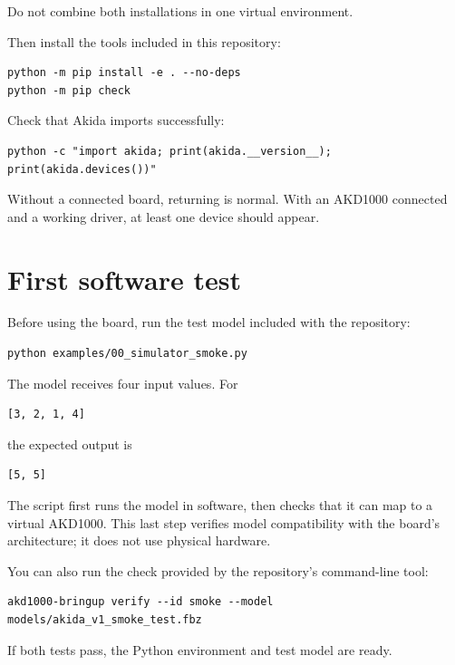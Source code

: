 Do not combine both installations in one virtual environment.

Then install the tools included in this repository:

\begin{lstlisting}
python -m pip install -e . --no-deps
python -m pip check
\end{lstlisting}

Check that Akida imports successfully:

\begin{lstlisting}
python -c "import akida; print(akida.__version__); print(akida.devices())"
\end{lstlisting}

Without a connected board,  returning \code{[]} is normal.
With an AKD1000 connected and a working driver, at least one device should appear.

\section{First software test}

Before using the board, run the test model included with the repository:

\begin{lstlisting}
python examples/00_simulator_smoke.py
\end{lstlisting}

The model receives four input values. For

\begin{lstlisting}
[3, 2, 1, 4]
\end{lstlisting}

the expected output is

\begin{lstlisting}
[5, 5]
\end{lstlisting}

The script first runs the model in software, then checks that it can map to a virtual
AKD1000. This last step verifies model compatibility with the board's architecture;
it does not use physical hardware.

You can also run the check provided by the repository's command-line tool:

\begin{lstlisting}
akd1000-bringup verify --id smoke --model models/akida_v1_smoke_test.fbz
\end{lstlisting}

If both tests pass, the Python environment and test model are ready.

